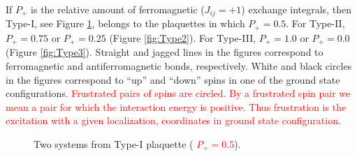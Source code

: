 \documentclass[preprint,12pt]{elsarticle}
\begin{document}
	If $P_+$ is the relative amount of ferromagnetic ($J_{ij}=+1$) exchange integrals, then Type-I, see Figure \ref{fig:Type1}, belongs to the plaquettes in which $P_+=0.5$. For Type-II, $P_+=0.75$ or $P_+=0.25$ (Figure \ref{fig:Type2}). For Type-III, $P_+=1.0$ or $P_+=0.0$ (Figure \ref{fig:Type3}). Straight and jagged lines in the figures correspond to ferromagnetic and antiferromagnetic bonds, respectively. White and black circles in the figures correspond to ``up'' and ``down'' spins in one of the ground state configurations. \textcolor{red}{Frustrated pairs of spins are circled. By a frustrated spin pair we mean a pair for which the interaction energy is positive. Thus frustration is the excitation with a given localization, coordinates in ground state configuration.}
	
	
	\begin{figure}[H]
		\centering
		\begin{minipage}[t]{0.3\textwidth}
			\centering
			\hspace{-4pt} 
			\caption{Two systems from Type-I plaquette (\textcolor{red}{  $P_+=0.5$}).}
			\label{fig:Type1} 
		\end{minipage}
		\hspace{5pt} 

\end{figure}
\end{document}
